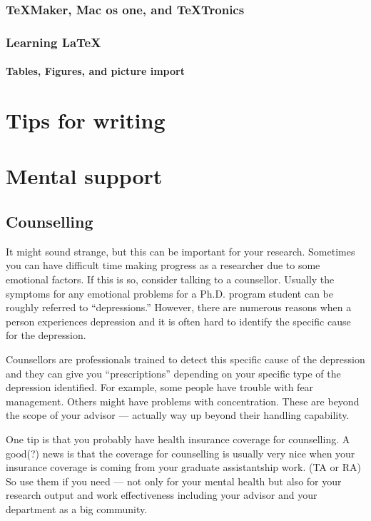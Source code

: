 \documentclass[11pt]{article}
\begin{document}
\subsubsection{TeXMaker, Mac os one, and TeXTronics}

\subsubsection{Learning LaTeX}


\paragraph{Tables, Figures, and picture import}


\section{Tips for writing}




\section{Mental support}

\subsection{Counselling}
It might sound strange, but this can be important for your research.
Sometimes you can have difficult time making progress as a researcher
due to some emotional factors. If this is so, consider talking to a
counsellor.  Usually the symptoms for any emotional problems for a Ph.D.
program student can be roughly referred to ``depressions.'' However,
there are numerous reasons when a person experiences depression and it
is often hard to identify the specific cause for the depression.

Counsellors are professionals trained to detect this specific cause of
the depression and they can give you ``prescriptions'' depending on your
specific type of the depression identified. For example, some people
have trouble with fear management. Others might have problems with
concentration. These are beyond the scope of your advisor --- actually
way up beyond their handling capability.

One tip is that you probably have health insurance coverage for
counselling. A good(?) news is that the coverage for counselling is
usually very nice when your insurance coverage is coming from your
graduate assistantship work. (TA or RA) So use them if you need --- not
only for your mental health but also for your research output and work
effectiveness including your advisor and your department as a big community.
\end{document}
